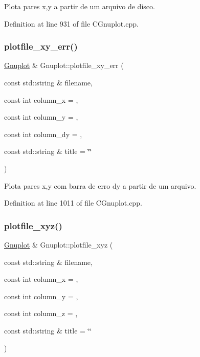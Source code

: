 Plota pares x,y a partir de um arquivo de disco. 



Definition at line 931 of file C\+Gnuplot.\+cpp.

\mbox{\label{class_gnuplot_a33ab4bb031fa6a6b798c90a9089648e9}} 
\subsubsection{\texorpdfstring{plotfile\+\_\+xy\+\_\+err()}{plotfile\_xy\_err()}}
{\footnotesize\ttfamily \hyperlink{class_gnuplot}{Gnuplot} \& Gnuplot\+::plotfile\+\_\+xy\+\_\+err (\begin{DoxyParamCaption}\item[{const std\+::string \&}]{filename,  }\item[{const int}]{column\+\_\+x = {},  }\item[{const int}]{column\+\_\+y = {},  }\item[{const int}]{column\+\_\+dy = {},  }\item[{const std\+::string \&}]{title = {\ttfamily \char`\"{}\char`\"{}} }\end{DoxyParamCaption})}



Plota pares x,y com barra de erro dy a partir de um arquivo. 



Definition at line 1011 of file C\+Gnuplot.\+cpp.

\mbox{\label{class_gnuplot_abd1c17c49fc59979a1143384c77c5b66}} 
\subsubsection{\texorpdfstring{plotfile\+\_\+xyz()}{plotfile\_xyz()}}
{\footnotesize\ttfamily \hyperlink{class_gnuplot}{Gnuplot} \& Gnuplot\+::plotfile\+\_\+xyz (\begin{DoxyParamCaption}\item[{const std\+::string \&}]{filename,  }\item[{const int}]{column\+\_\+x = {},  }\item[{const int}]{column\+\_\+y = {},  }\item[{const int}]{column\+\_\+z = {},  }\item[{const std\+::string \&}]{title = {\ttfamily \char`\"{}\char`\"{}} }\end{DoxyParamCaption})}



